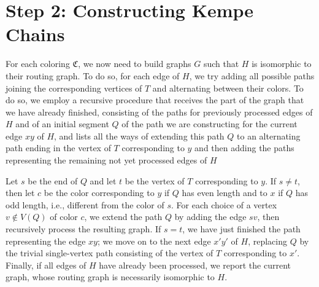 \section{Step 2: Constructing Kempe Chains}

For each coloring $\mathfrak{C}$, we now need to build graphs $G$ such that $H$ is isomorphic to their routing graph. 
To do so, for each edge of $H$, we try adding all possible paths joining the corresponding vertices of $T$
and alternating between their colors. To do so, we employ a recursive procedure that receives
the part of the graph that we have already finished, consisting of the paths for previously processed
edges of $H$ and of an initial segment $Q$ of the path we are constructing for the current edge $xy$ of $H$,
and lists all the ways of extending this path $Q$ to an alternating path ending in the vertex of $T$ corresponding
to $y$ and then adding the paths representing the remaining not yet processed edges of $H$

Let $s$ be the end of $Q$ and let $t$ be the vertex of $T$ corresponding to $y$. If $s \neq t$, then let $c$ be the color
corresponding to $y$ if $Q$ has even length and to $x$ if $Q$ has odd length, i.e., different from the color of $s$.
For each choice of a vertex $v\not\in V(Q)$ of color $c$, we extend the path $Q$ by adding the edge $sv$, then
recursively process the resulting graph. If $s=t$, we have just finished the path representing the edge $xy$;
we move on to the next edge $x'y'$ of $H$, replacing $Q$ by the trivial single-vertex path consisting of the vertex of $T$
corresponding to $x'$. Finally, if all edges of $H$ have already been processed, we report the current graph, whose
routing graph is necessarily isomorphic to $H$.

